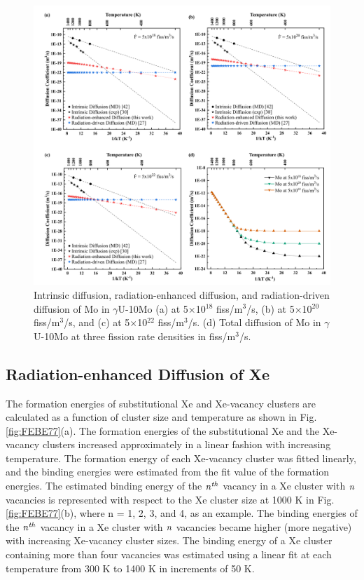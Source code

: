 \documentclass[preprint,12pt]{elsarticle}
\begin{document}
\begin{figure}[hbt!]
\centering
\includegraphics[width=1\textwidth]{Fig6.png}
\caption{Intrinsic diffusion, radiation-enhanced diffusion, and radiation-driven diffusion of Mo in $\gamma$U-10Mo (a) at 5$\times$10$^{18}$ fiss/m$^{3}$/s, (b) at 5$\times$10$^{20}$ fiss/m$^{3}$/s, and (c) at 5$\times$10$^{22}$ fiss/m$^{3}$/s. (d) Total diffusion of Mo in $\gamma$U-10Mo at three fission rate densities in fiss/m$^{3}$/s.}
\label{fig:eachMo}
\end{figure}

\FloatBarrier

\subsection{Radiation-enhanced Diffusion of Xe}
The formation energies of substitutional Xe and Xe-vacancy clusters are calculated as a function of cluster size and temperature as shown in Fig. \ref{fig:FEBE77}(a). The formation energies of the substitutional Xe and the Xe-vacancy clusters increased approximately in a linear fashion with increasing temperature. The formation energy of each Xe-vacancy cluster was fitted linearly, and the binding energies were estimated from the fit value of the formation energies. The estimated binding energy of the $\it{n}^{th}$ vacancy in a Xe cluster with $\it{n}$ vacancies is represented with respect to the Xe cluster size at 1000 K in Fig. \ref{fig:FEBE77}(b), where n = 1, 2, 3, and 4, as an example. The binding energies of the $\it{n}^{th}$ vacancy in a Xe cluster with $\it{n}$ vacancies became higher (more negative) with increasing Xe-vacancy cluster sizes. The binding energy of a Xe cluster containing more than four vacancies was estimated using a linear fit at each temperature from 300 K to 1400 K in increments of 50 K. 
\end{document}
